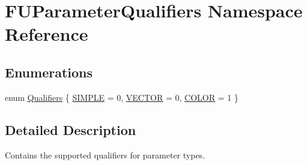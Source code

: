 \hypertarget{namespaceFUParameterQualifiers}{
\section{FUParameterQualifiers Namespace Reference}
\label{namespaceFUParameterQualifiers}
}
\subsection*{Enumerations}
\begin{DoxyCompactItemize}
\item 
enum \hyperlink{namespaceFUParameterQualifiers_a3eda99ee3b301da228d3df63a75d3612}{Qualifiers} \{ \hyperlink{namespaceFUParameterQualifiers_a3eda99ee3b301da228d3df63a75d3612afef86b7cea1d426b7e6de4cb05b68613}{SIMPLE} =  0, 
\hyperlink{namespaceFUParameterQualifiers_a3eda99ee3b301da228d3df63a75d3612a44b68b17b68bed4858dff75783f8c140}{VECTOR} =  0, 
\hyperlink{namespaceFUParameterQualifiers_a3eda99ee3b301da228d3df63a75d3612a9db34754eb70fd0eed715519d941747d}{COLOR} =  1
 \}
\end{DoxyCompactItemize}


\subsection{Detailed Description}
Contains the supported qualifiers for parameter types. 


